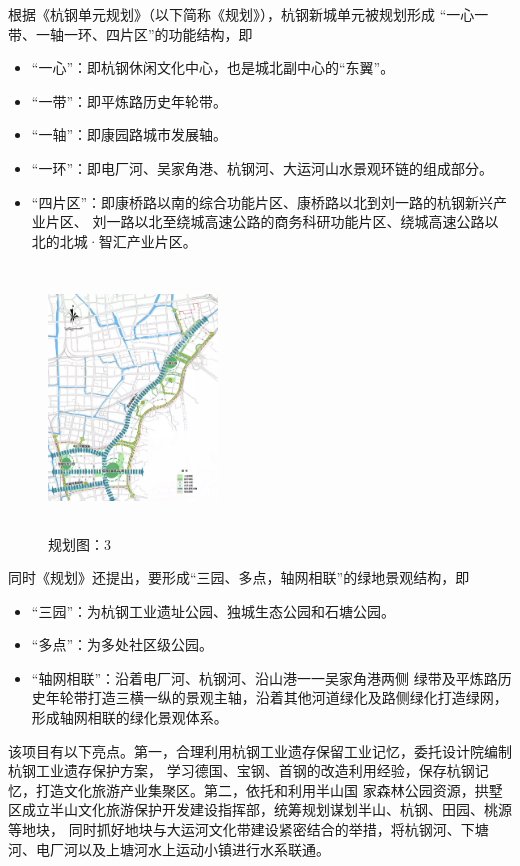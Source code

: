 \documentclass[H:\workspace\担保人财务信息2\杭州大运河\HangZhouText.tex]{subfiles}
\begin{document}
根据《杭钢单元规划》（以下简称《规划》），杭钢新城单元被规划形成 “一心一带、一轴一环、四片区”的功能结构，即
\begin{itemize}
    \item “一心”：即杭钢休闲文化中心，也是城北副中心的“东翼”。
    \item “一带”：即平炼路历史年轮带。
    \item “一轴”：即康园路城市发展轴。
    \item “一环”：即电厂河、吴家角港、杭钢河、大运河山水景观环链的组成部分。
    \item “四片区”：即康桥路以南的综合功能片区、康桥路以北到刘一路的杭钢新兴产业片区、
    刘一路以北至绕城高速公路的商务科研功能片区、绕城高速公路以北的北城·智汇产业片区。
\end{itemize}

\begin{figure}
    \centering 
    \vspace{-0.5cm}
    \includegraphics[width=0.4\textwidth,height=7cm]{img5.png}
    \caption{规划图：3}
    \vspace{-1cm}
    \label{fig:c}
\end{figure}

同时《规划》还提出，要形成“三园、多点，轴网相联”的绿地景观结构，即
\begin{itemize}
    \item “三园”：为杭钢工业遗址公园、独城生态公园和石塘公园。
    \item “多点”：为多处社区级公园。
    \item “轴网相联”：沿着电厂河、杭钢河、沿山港一一吴家角港两侧
    绿带及平炼路历史年轮带打造三横一纵的景观主轴，沿着其他河道绿化及路侧绿化打造绿网，
    形成轴网相联的绿化景观体系。
\end{itemize}

该项目有以下亮点。第一，合理利用杭钢工业遗存保留工业记忆，委托设计院编制杭钢工业遗存保护方案，
学习德国、宝钢、首钢的改造利用经验，保存杭钢记忆，打造文化旅游产业集聚区。第二，依托和利用半山国
家森林公园资源，拱墅区成立半山文化旅游保护开发建设指挥部，统筹规划谋划半山、杭钢、田园、桃源等地块，
同时抓好地块与大运河文化带建设紧密结合的举措，将杭钢河、下塘河、电厂河以及上塘河水上运动小镇进行水系联通。
\end{document}
